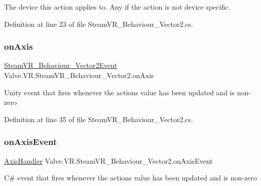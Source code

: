 The device this action applies to. Any if the action is not device specific. 



Definition at line 23 of file Steam\+V\+R\+\_\+\+Behaviour\+\_\+\+Vector2.\+cs.

\mbox{\label{class_valve_1_1_v_r_1_1_steam_v_r___behaviour___vector2_a6fc3afc3d4382dacecb1cff67d0ea6a9}} 
\subsubsection{\texorpdfstring{onAxis}{onAxis}}
{\footnotesize\ttfamily \mbox{\hyperlink{class_valve_1_1_v_r_1_1_steam_v_r___behaviour___vector2_event}{Steam\+V\+R\+\_\+\+Behaviour\+\_\+\+Vector2\+Event}} Valve.\+V\+R.\+Steam\+V\+R\+\_\+\+Behaviour\+\_\+\+Vector2.\+on\+Axis}



Unity event that fires whenever the action\textquotesingle{}s value has been updated and is non-\/zero 



Definition at line 35 of file Steam\+V\+R\+\_\+\+Behaviour\+\_\+\+Vector2.\+cs.

\mbox{\label{class_valve_1_1_v_r_1_1_steam_v_r___behaviour___vector2_a9733a0718e19f764f7faec02c5aac604}} 
\subsubsection{\texorpdfstring{onAxisEvent}{onAxisEvent}}
{\footnotesize\ttfamily \mbox{\hyperlink{class_valve_1_1_v_r_1_1_steam_v_r___behaviour___vector2_a8d32523a44d5d8f20a99caf00f35020d}{Axis\+Handler}} Valve.\+V\+R.\+Steam\+V\+R\+\_\+\+Behaviour\+\_\+\+Vector2.\+on\+Axis\+Event}



C\# event that fires whenever the action\textquotesingle{}s value has been updated and is non-\/zero 



